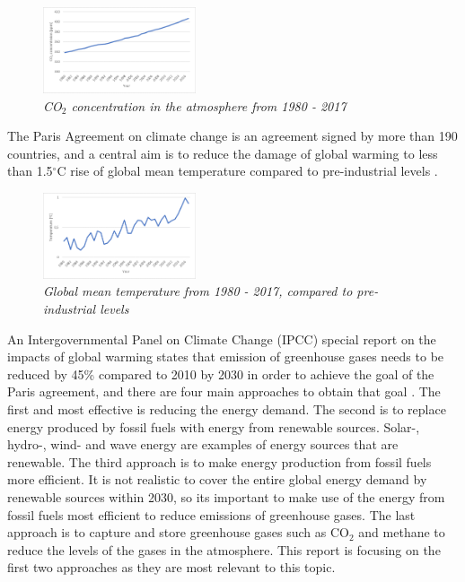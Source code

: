 \begin{figure}
    \centering
    \vspace{-4mm}
    \includegraphics[width=0.4\textwidth]{vedlegg/co2new}
  \caption{\textit{CO$_2$ concentration in the atmosphere from 1980 - 2017}}
  \label{fig:co2}
  \vspace{-30mm}
\end{figure}


The Paris Agreement on climate change is an agreement signed by more than 190 countries, and a central aim is to reduce the damage of global warming to less than 1.5$^\circ$C rise of global mean temperature compared to pre-industrial levels \cite{paris}. 


\pagebreak

\begin{figure}
    \centering
    \includegraphics[width=0.4\textwidth]{vedlegg/tempnew}
    \caption{\textit{Global mean temperature from 1980 - 2017, compared to pre-industrial levels}}
    \label{fig:temp}
\end{figure}

An Intergovernmental Panel on Climate Change (IPCC) special report on the impacts of global warming states that emission of greenhouse gases needs to be reduced by 45\% compared to 2010 by 2030 in order to achieve the goal of the Paris agreement, and there are four main approaches to obtain that goal \cite{Ipcc}. The first and most effective is reducing the energy demand. The second is to replace energy produced by fossil fuels with energy from renewable sources. Solar-, hydro-, wind- and wave energy are examples of energy sources that are renewable. The third approach is to make energy production from fossil fuels more efficient. It is not realistic to cover the  entire global energy demand by renewable sources within 2030, so its important to make use of the energy from fossil fuels most efficient to reduce emissions of greenhouse gases. The last approach is to capture and store greenhouse gases such as CO$_2$ and methane to reduce the levels of the gases in the atmosphere. This report is focusing on the first two approaches as they are most relevant to this topic.

